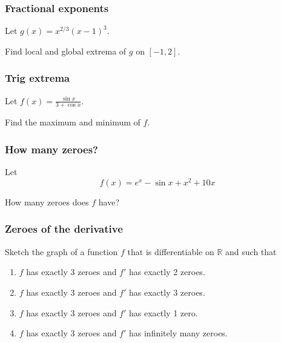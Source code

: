 \documentclass[14pt]{beamer}
\begin{document}

	\begin{frame}[t]
		\frametitle{Fractional exponents}

		Let $\displaystyle g(x) = x^{2/3}(x-1)^{3}.$

		Find local and global extrema of $g$ on $\displaystyle [-1,2]$.
	\end{frame}

	\begin{frame}[t]
		\frametitle{Trig extrema}

		Let $\displaystyle f(x) = \frac{\sin x}{3 + \cos x}.$

		Find the maximum and minimum of $f$.
	\end{frame}

	\begin{frame}[t]
		\frametitle{How many zeroes?}

		Let
		\[
			f(x) = e^{x}- \sin x + x^{2}+ 10x
		\]

		How many zeroes does $f$ have?
	\end{frame}

	\begin{frame}[t]
		\frametitle{Zeroes of the derivative}

		Sketch the graph of a function $f$ that is differentiable on $\mathbb{R}$
		and such that

		\begin{enumerate}
			\item $f$ has exactly 3 zeroes and $f'$ has exactly 2 zeroes.

			\item $f$ has exactly 3 zeroes and $f'$ has exactly 3 zeroes.

			\item $f$ has exactly 3 zeroes and $f'$ has exactly 1 zero.

			\item $f$ has exactly 3 zeroes and $f'$ has infinitely many zeroes.
		\end{enumerate}
	\end{frame}
\end{document}
